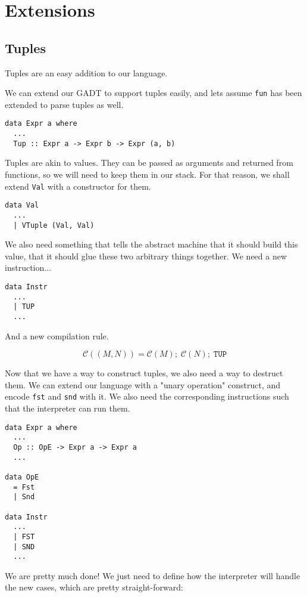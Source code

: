\section{Extensions}
\subsection{Tuples}
Tuples are an easy addition to our language.

We can extend our GADT to support tuples easily, and lets assume \texttt{fun} has been extended to parse 
tuples as well.

\begin{lstlisting}
data Expr a where
  ...
  Tup :: Expr a -> Expr b -> Expr (a, b)
\end{lstlisting}

Tuples are akin to values. They can be passed as arguments and returned from functions, so we will need
to keep them in our stack. For that reason, we shall extend \texttt{Val} with a constructor for them.

\begin{lstlisting}
data Val
  ...
  | VTuple (Val, Val)
\end{lstlisting}

We also need something that tells the abstract machine that it should build this value, that it should
glue these two arbitrary things together. We need a new instruction...

\begin{lstlisting}
data Instr
  ...
  | TUP
  ...
\end{lstlisting}

And a new compilation rule.

\[ \mathcal{C}((M, N)) = \mathcal{C}(M);\; \mathcal{C}(N);\; \texttt{TUP} \]

Now that we have a way to construct tuples, we also need a way to destruct them. We can extend our language
with a "unary operation" construct, and encode \texttt{fst} and \texttt{snd} with it. We also need the corresponding
instructions such that the interpreter can run them.

\begin{lstlisting}
data Expr a where
  ...
  Op :: OpE -> Expr a -> Expr a
  ...

data OpE
  = Fst
  | Snd

data Instr
  ...
  | FST
  | SND
  ...
\end{lstlisting}

We are pretty much done! We just need to define how the interpreter will handle the new cases, which are pretty straight-forward:

